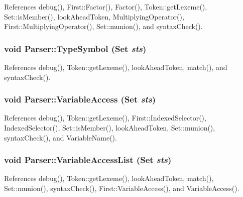 References debug(), First::Factor(), Factor(), Token::getLexeme(), Set::isMember(), lookAheadToken, MultiplyingOperator(), First::MultiplyingOperator(), Set::munion(), and syntaxCheck().

\hypertarget{classParser_a0bb180ec60cb61345a7890c8766f0048}{
\subsubsection[{TypeSymbol}]{\setlength{\rightskip}{0pt plus 5cm}void Parser::TypeSymbol ({\bf Set} {\em sts})}}
\label{classParser_a0bb180ec60cb61345a7890c8766f0048}


References debug(), Token::getLexeme(), lookAheadToken, match(), and syntaxCheck().

\hypertarget{classParser_ac004c4cc14aeca2512087a692594786b}{
\subsubsection[{VariableAccess}]{\setlength{\rightskip}{0pt plus 5cm}void Parser::VariableAccess ({\bf Set} {\em sts})}}
\label{classParser_ac004c4cc14aeca2512087a692594786b}


References debug(), Token::getLexeme(), First::IndexedSelector(), IndexedSelector(), Set::isMember(), lookAheadToken, Set::munion(), syntaxCheck(), and VariableName().

\hypertarget{classParser_a8b1f76ff69c6cd8e54c0d06405e26f38}{
\subsubsection[{VariableAccessList}]{\setlength{\rightskip}{0pt plus 5cm}void Parser::VariableAccessList ({\bf Set} {\em sts})}}
\label{classParser_a8b1f76ff69c6cd8e54c0d06405e26f38}


References debug(), Token::getLexeme(), lookAheadToken, match(), Set::munion(), syntaxCheck(), First::VariableAccess(), and VariableAccess().

